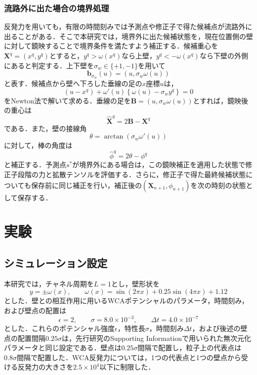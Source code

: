 \documentclass[dvipdfmx]{ampbt}
\begin{document}
  \subsubsection{流路外に出た場合の境界処理}
  反発力を用いても，有限の時間刻みでは予測点や修正子で得た候補点が流路外に出ることがある．そこで本研究では，境界外に出た候補状態を，現在位置側の壁に対して鏡映することで境界条件を満たすよう補正する．候補重心を$\bm{X}^q=(x^q,y^q)$とすると，$y^q>\omega(x^q)$なら上壁，$y^q<-\omega(x^q)$なら下壁の外側にあると判定する．上下壁を$\sigma_w\in\{+1,-1\}$を用いて
  \begin{equation}
    \bm{b}_{\sigma_w}(u)=\left(u,\sigma_w\omega(u)\right)
  \end{equation}
  と表す．候補点から壁へ下ろした垂線の足の$x$座標$u$は，
  \begin{equation}
    (u-x^q)+\omega'(u)\left\{\omega(u)-\sigma_w y^q\right\}=0
    \label{eq:foot-condition}
  \end{equation}
  をNewton法で解いて求める．垂線の足を$\bm{B}=(u,\sigma_w\omega(u))$とすれば，鏡映後の重心は
  \begin{equation}
    \widehat{\bm{X}}^q=2\bm{B}-\bm{X}^q
    \label{eq:reflected-position}
  \end{equation}
  である．また，壁の接線角
  \begin{equation}
    \theta=\arctan\left(\sigma_w\omega'(u)\right)
  \end{equation}
  に対して，棒の角度は
  \begin{equation}
    \widehat{\phi}^q=2\theta-\phi^q
    \label{eq:reflected-angle}
  \end{equation}
  と補正する．予測点$s^\ast$が境界外にある場合は，この鏡映補正を適用した状態で修正子段階の力と拡散テンソルを評価する．さらに，修正子で得た最終候補状態についても保存前に同じ補正を行い，補正後の$(\bm{X}_{n+1},\phi_{n+1})$を次の時刻の状態として保存する．

  \section{実験}

  \subsection{シミュレーション設定}
  本研究では，チャネル周期を$L=1$とし，壁形状を
  \begin{equation}
    y=\pm\omega(x),\qquad
    \omega(x)=\sin(2\pi x)+0.25\sin(4\pi x)+1.12
    \label{eq:channel-shape}
  \end{equation}
  とした．壁との相互作用に用いるWCAポテンシャルのパラメータ，時間刻み，および壁点の配置は
  \begin{equation}
    \epsilon=2,\qquad
    \sigma=8.0\times 10^{-3},\qquad
    \Delta t=4.0\times 10^{-7}
  \end{equation}
  とした．これらのポテンシャル強度$\epsilon$，特性長$\sigma$，時間刻み$\Delta t$，および後述の壁点の配置間隔$0.25\sigma$は，先行研究\cite{yang2019}のSupporting Informationで用いられた無次元化パラメータと同じ設定である．壁点は$0.25\sigma$間隔で配置し，粒子上の代表点は$0.8\sigma$間隔で配置した．WCA反発力については，1つの代表点と1つの壁点から受ける反発力の大きさを$2.5\times 10^4$以下に制限した．
\end{document}
